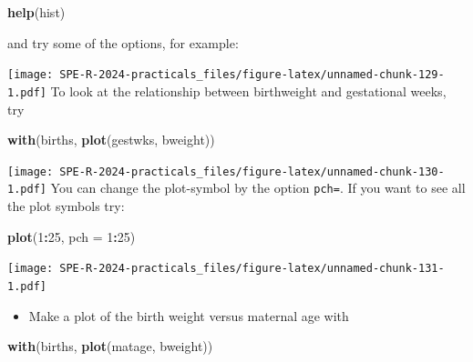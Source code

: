 \documentclass[
]{book}
\newenvironment{Shaded}{\begin{snugshade}}{\end{snugshade}}
\newcommand{\AttributeTok}[1]{\textcolor[rgb]{0.13,0.29,0.53}{#1}}
\newcommand{\DecValTok}[1]{\textcolor[rgb]{0.00,0.00,0.81}{#1}}
\newcommand{\FunctionTok}[1]{\textcolor[rgb]{0.13,0.29,0.53}{\textbf{#1}}}
\newcommand{\NormalTok}[1]{#1}
\newcommand{\SpecialCharTok}[1]{\textcolor[rgb]{0.81,0.36,0.00}{\textbf{#1}}}
\newcommand{\StringTok}[1]{\textcolor[rgb]{0.31,0.60,0.02}{#1}}
\providecommand{\tightlist}{%
  \setlength{\itemsep}{0pt}\setlength{\parskip}{0pt}}
\begin{document}
\begin{Shaded}
\begin{Highlighting}[]
\FunctionTok{help}\NormalTok{(hist)}
\end{Highlighting}
\end{Shaded}

and try some of the options, for example:

\begin{Shaded}
\end{Shaded}

\texttt{[image: SPE-R-2024-practicals\_files/figure-latex/unnamed-chunk-129-1.pdf]}
To look at the relationship between birthweight and gestational weeks, try

\begin{Shaded}
\begin{Highlighting}[]
\FunctionTok{with}\NormalTok{(births, }\FunctionTok{plot}\NormalTok{(gestwks, bweight))}
\end{Highlighting}
\end{Shaded}

\texttt{[image: SPE-R-2024-practicals\_files/figure-latex/unnamed-chunk-130-1.pdf]}
You can change the plot-symbol by the option \texttt{pch=}. If you
want to see all the plot symbols try:

\begin{Shaded}
\begin{Highlighting}[]
\FunctionTok{plot}\NormalTok{(}\DecValTok{1}\SpecialCharTok{:}\DecValTok{25}\NormalTok{, }\AttributeTok{pch =} \DecValTok{1}\SpecialCharTok{:}\DecValTok{25}\NormalTok{)}
\end{Highlighting}
\end{Shaded}

\texttt{[image: SPE-R-2024-practicals\_files/figure-latex/unnamed-chunk-131-1.pdf]}

\begin{itemize}
\tightlist
\item
  Make a plot of the birth weight versus maternal age with
\end{itemize}

\begin{Shaded}
\begin{Highlighting}[]
\FunctionTok{with}\NormalTok{(births, }\FunctionTok{plot}\NormalTok{(matage, bweight))}
\end{Highlighting}
\end{Shaded}
\end{document}
